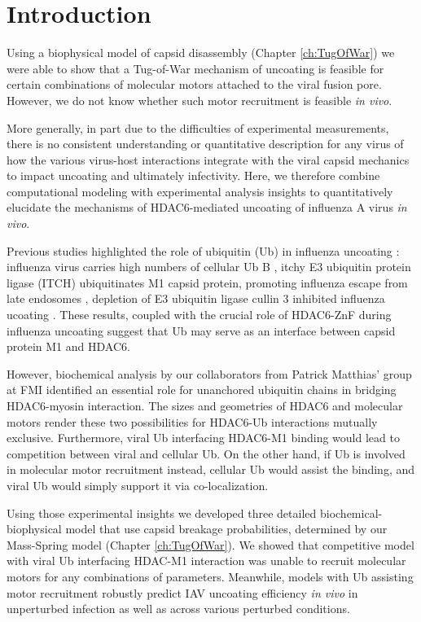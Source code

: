 \section{Introduction}

Using a biophysical model of capsid disassembly (Chapter \ref{ch:TugOfWar}) we were able to show that a Tug-of-War mechanism of uncoating is feasible for certain combinations of molecular motors attached to the viral fusion pore. However, we do not know whether such motor recruitment is feasible \textit{in vivo}.

More generally, in part due to the difficulties of experimental measurements, there is no consistent understanding or quantitative description for any virus of how the various virus-host interactions integrate with the viral capsid mechanics to impact uncoating and ultimately infectivity. Here, we therefore combine computational modeling with experimental analysis insights to quantitatively elucidate the mechanisms of HDAC6-mediated uncoating of influenza A virus \textit{in vivo}. 

Previous studies highlighted the role of ubiquitin (Ub) in influenza uncoating \cite{rudnicka2016ubiquitin}: influenza virus carries high numbers of cellular Ub B \cite{hutchinson2014conserved}, itchy E3 ubiquitin protein ligase (ITCH) ubiquitinates M1 capsid protein, promoting influenza escape from late endosomes \cite{su2013pooled}, depletion of E3 ubiquitin ligase cullin 3 inhibited influenza ucoating \cite{hubner2012cullin, huotari2012cullin}. These results, coupled with the crucial role of HDAC6-ZnF during influenza uncoating \cite{banerjee2014influenza} suggest that Ub may serve as an interface between capsid protein M1 and HDAC6.

However, biochemical analysis by our collaborators from Patrick Matthias' group at FMI identified an essential role for unanchored ubiquitin chains in bridging HDAC6-myosin interaction. The sizes and geometries of HDAC6 and molecular motors render these two possibilities for HDAC6-Ub interactions mutually exclusive. Furthermore, viral Ub interfacing HDAC6-M1 binding would lead to competition between viral and cellular Ub. On the other hand, if Ub is involved in molecular motor recruitment instead, cellular Ub would assist the binding, and viral Ub would simply support it via co-localization.

Using those experimental insights we developed three detailed biochemical-biophysical model that use capsid breakage probabilities, determined by our Mass-Spring model (Chapter \ref{ch:TugOfWar}). We showed that competitive model with viral Ub interfacing HDAC-M1 interaction was unable to recruit molecular motors for any combinations of parameters. Meanwhile, models with Ub assisting motor recruitment robustly predict IAV uncoating efficiency \textit{in vivo} in unperturbed infection as well as across various perturbed conditions.

